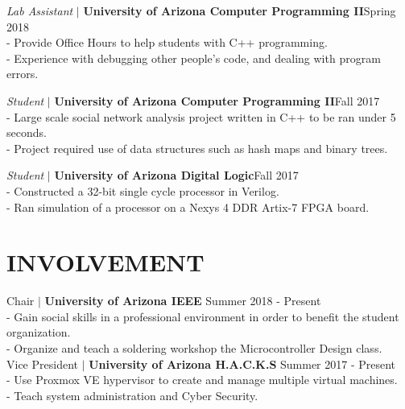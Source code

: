 \documentclass[line, 12pt]{res}
\newcommand\tab[1][0.5cm]{\hspace*{#1}}
\begin{document}
\begin{resume}
                {\sl Lab Assistant} $\mid$ \textbf{University of Arizona Computer Programming II}\hfill Spring 2018 \\
                 	\tab - Provide Office Hours to help students with C++ programming. \\
                 	\tab - Experience with debugging other people’s code, and dealing with program errors.


				{\sl Student} $\mid$ \textbf{University of Arizona Computer Programming II}\hfill Fall 2017 \\
						\tab - Large scale social network analysis project written in C++ to be ran under 5 seconds. \\
						\tab - Project required use of data structures such as hash maps and binary trees.

				{\sl Student} $\mid$ \textbf{University of Arizona Digital Logic}\hfill Fall 2017 \\
						\tab - Constructed a 32-bit single cycle processor in Verilog. \\
						\tab - Ran simulation of a processor on a Nexys 4 DDR Artix-7 FPGA board.

\section{INVOLVEMENT} 
	Chair $\mid$ \textbf{University of Arizona IEEE} \hfill Summer 2018 - Present \\
		\tab - Gain social skills in a professional environment in order to benefit the student organization. \\
		\tab - Organize and teach a soldering workshop the Microcontroller Design class.\\
	
	Vice President $\mid$ \textbf{University of Arizona H.A.C.K.S} \hfill Summer 2017 - Present \\
		\tab - Use Proxmox VE hypervisor to create and manage multiple virtual machines. \\
		\tab - Teach system administration and Cyber Security.
	

\end{resume}
\end{document}
